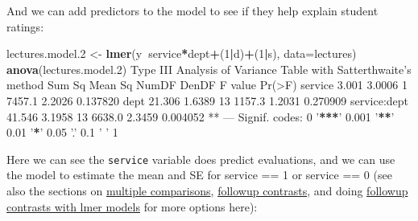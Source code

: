 \documentclass[]{article}
\newenvironment{Shaded}{\begin{snugshade}}{\end{snugshade}}
\newcommand{\DataTypeTok}[1]{\textcolor[rgb]{0.13,0.29,0.53}{#1}}
\newcommand{\DecValTok}[1]{\textcolor[rgb]{0.00,0.00,0.81}{#1}}
\newcommand{\ErrorTok}[1]{\textcolor[rgb]{0.64,0.00,0.00}{\textbf{#1}}}
\newcommand{\FloatTok}[1]{\textcolor[rgb]{0.00,0.00,0.81}{#1}}
\newcommand{\KeywordTok}[1]{\textcolor[rgb]{0.13,0.29,0.53}{\textbf{#1}}}
\newcommand{\NormalTok}[1]{#1}
\newcommand{\OperatorTok}[1]{\textcolor[rgb]{0.81,0.36,0.00}{\textbf{#1}}}
\newcommand{\StringTok}[1]{\textcolor[rgb]{0.31,0.60,0.02}{#1}}
\begin{document}
And we can add predictors to the model to see if they help explain student
ratings:

\begin{Shaded}
\begin{Highlighting}[]
\NormalTok{lectures.model}\FloatTok{.2}\NormalTok{ <-}\StringTok{ }\KeywordTok{lmer}\NormalTok{(y}\OperatorTok{~}\NormalTok{service}\OperatorTok{*}\NormalTok{dept}\OperatorTok{+}\NormalTok{(}\DecValTok{1}\OperatorTok{|}\NormalTok{d)}\OperatorTok{+}\NormalTok{(}\DecValTok{1}\OperatorTok{|}\NormalTok{s), }\DataTypeTok{data=}\NormalTok{lectures)}
\KeywordTok{anova}\NormalTok{(lectures.model}\FloatTok{.2}\NormalTok{)}
\NormalTok{Type III Analysis of Variance Table with Satterthwaite}\StringTok{'s method}
\StringTok{             Sum Sq Mean Sq NumDF  DenDF F value   Pr(>F)   }
\StringTok{service       3.001  3.0006     1 7457.1  2.2026 0.137820   }
\StringTok{dept         21.306  1.6389    13 1157.3  1.2031 0.270909   }
\StringTok{service:dept 41.546  3.1958    13 6638.0  2.3459 0.004052 **}
\StringTok{---}
\StringTok{Signif. codes:  0 '}\OperatorTok{**}\ErrorTok{*}\StringTok{' 0.001 '}\OperatorTok{**}\StringTok{' 0.01 '}\OperatorTok{*}\StringTok{' 0.05 '}\NormalTok{.}\StringTok{' 0.1 '} \StringTok{' 1}
\end{Highlighting}
\end{Shaded}

Here we can see the \texttt{service} variable does predict evaluations, and we can use
the model to estimate the mean and SE for service == 1 or service == 0 (see also
the sections on \protect\hyperlink{multiple-comparisons}{multiple comparisons},
\protect\hyperlink{contrasts}{followup contrasts}, and doing
\protect\hyperlink{contrasts-lmer}{followup contrasts with lmer models} for more options here):
\end{document}
